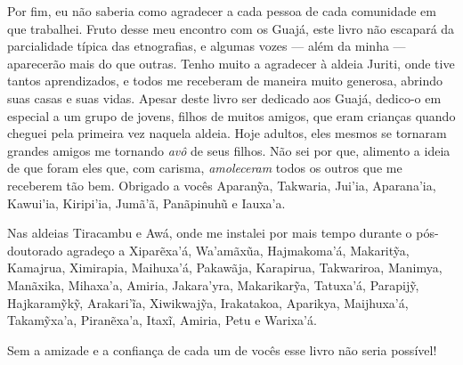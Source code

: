 Por fim, eu não saberia como agradecer a cada pessoa de cada comunidade
em que trabalhei. Fruto desse meu encontro com os Guajá, este livro não
escapará da parcialidade típica das etnografias, e algumas vozes --- além
da minha --- aparecerão mais do que outras. Tenho muito a agradecer à
aldeia Juriti, onde tive tantos aprendizados, e todos me receberam de
maneira muito generosa, abrindo suas casas e suas vidas. Apesar deste
livro ser dedicado aos Guajá, dedico-o em especial a um grupo de jovens,
filhos de muitos amigos, que eram crianças quando cheguei pela primeira
vez naquela aldeia. Hoje adultos, eles mesmos se tornaram grandes amigos
me tornando \textit{avô} de seus filhos. Não sei por que, alimento a ideia de
que foram eles que, com carisma, \textit{amoleceram} todos os outros que me
receberem tão bem. Obrigado a vocês Aparanỹa, Takwaria, Jui'ia,
Aparana'ia, Kawui'ia, Kiripi'ia, Jumã'ã, Panãpinuhũ e Iauxa'a.

Nas aldeias Tiracambu e Awá, onde me instalei por mais tempo durante o
pós-doutorado agradeço a Xiparẽxa'á, Wa'amãxũa, Hajmakoma'á, Makaritỹa,
Kamajrua, Ximirapia, Maihuxa'á, Pakawãja, Karapirua, Takwariroa,
Manimya, Manãxika, Mihaxa'a, Amiria, Jakara'yra, Makarikarỹa, Tatuxa'á, Parapijỹ,
Hajkaramỹkỹ, Arakari'ĩa, Xiwikwajỹa, Irakatakoa, Aparikya, Maijhuxa'á,
Takamỹxa'a, Piranẽxa'a, Itaxĩ, Amiria, Petu e Warixa'á.

Sem a amizade e a confiança de cada um de vocês esse livro não seria
possível!
